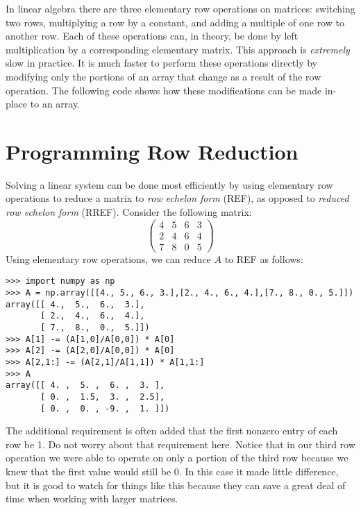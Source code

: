\label{lab:LUdecomp}

In linear algebra there are three elementary row operations on matrices: switching two rows, multiplying a row by a constant, and adding a multiple of one row to another row.
Each of these operations can, in theory, be done by left multiplication by a corresponding elementary matrix.
This approach is \emph{extremely} slow in practice.
It is much faster to perform these operations directly by modifying only the portions of an array that change as a result of the row operation.
The following code shows how these modifications can be made in-place to an array.


\section*{Programming Row Reduction}
Solving a linear system can be done most efficiently by using elementary row operations to reduce a matrix to \emph{row echelon form} (REF), as opposed to \emph{reduced row echelon form} (RREF).
Consider the following matrix:
\[
\begin{pmatrix}
4&5&6&3 \\
2&4&6&4 \\
7&8&0&5
\end{pmatrix}
\]
Using elementary row operations, we can reduce $A$ to REF as follows:
\begin{lstlisting}
>>> import numpy as np
>>> A = np.array([[4., 5., 6., 3.],[2., 4., 6., 4.],[7., 8., 0., 5.]])
array([[ 4.,  5.,  6.,  3.],
       [ 2.,  4.,  6.,  4.],
       [ 7.,  8.,  0.,  5.]])
>>> A[1] -= (A[1,0]/A[0,0]) * A[0]
>>> A[2] -= (A[2,0]/A[0,0]) * A[0]
>>> A[2,1:] -= (A[2,1]/A[1,1]) * A[1,1:]
>>> A
array([[ 4. ,  5. ,  6. ,  3. ],
       [ 0. ,  1.5,  3. ,  2.5],
       [ 0. ,  0. , -9. ,  1. ]])
\end{lstlisting}
The additional requirement is often added that the first nonzero entry of each row be 1.
Do not worry about that requirement here.
Notice that in our third row operation we were able to operate on only a portion of the third row because we knew that the first value would still be 0.
In this case it made little difference, but it is good to watch for things like this because they can save a great deal of time when working with larger matrices. 

